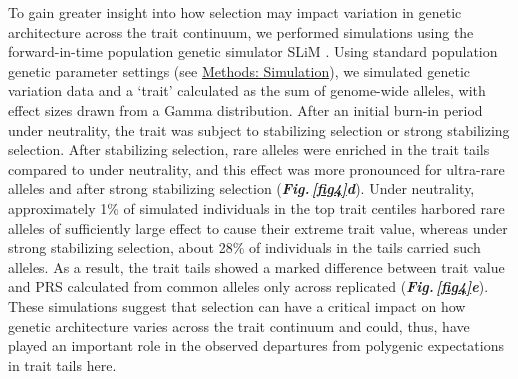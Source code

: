 \documentclass[12pt]{zHenriquesLab-StyleBioRxiv}
\newcommand\dref[2]{\normalsize{\textbf{\textit{Fig.\,\ref{#1}#2}}}\normalsize{}}
\begin{document}
To gain greater insight into how selection may impact variation 
in genetic architecture across the trait continuum, we 
performed simulations using the forward-in-time population 
genetic simulator SLiM \cite{BC_2019}. Using standard population 
genetic parameter settings (see \hyperref[sec:methods:sims]{Methods: Simulation}),
we simulated genetic variation data and a ‘trait’ calculated as the sum of 
genome-wide alleles, with effect sizes drawn from a Gamma 
distribution. After an initial burn-in period under neutrality, 
the trait was subject to stabilizing selection or strong 
stabilizing selection. After stabilizing selection, rare alleles 
were enriched in the trait tails compared to under neutrality, 
and this effect was more pronounced for ultra-rare alleles and 
after strong stabilizing selection (\dref{fig4}{d}). Under 
neutrality, approximately 1\% of simulated individuals in the 
top trait centiles harbored rare alleles of sufficiently large 
effect to cause their extreme trait value, whereas under strong
stabilizing selection, about 28\% of individuals in the tails 
carried such alleles. As a result, the trait tails showed a marked 
difference between trait value and PRS calculated from common alleles 
only across replicated (\dref{fig4}{e}). These simulations 
suggest that selection can have a critical impact on how genetic 
architecture varies across the trait continuum and could, thus, 
have played an important role in the observed departures from 
polygenic expectations in trait tails here.
\end{document}
